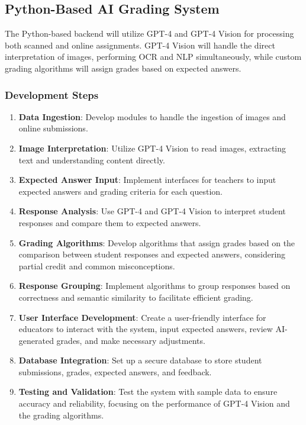 \documentclass[ms,twoside,print]{nuthesis}
\begin{document}
\subsection{Python-Based AI Grading System}

The Python-based backend will utilize GPT-4 and GPT-4 Vision for processing both scanned and online assignments. GPT-4 Vision will handle the direct interpretation of images, performing OCR and NLP simultaneously, while custom grading algorithms will assign grades based on expected answers.

\subsubsection{Development Steps}

\begin{enumerate}
    \item \textbf{Data Ingestion}: Develop modules to handle the ingestion of images and online submissions.
    \item \textbf{Image Interpretation}: Utilize GPT-4 Vision to read images, extracting text and understanding content directly.
    \item \textbf{Expected Answer Input}: Implement interfaces for teachers to input expected answers and grading criteria for each question.
    \item \textbf{Response Analysis}: Use GPT-4 and GPT-4 Vision to interpret student responses and compare them to expected answers.
    \item \textbf{Grading Algorithms}: Develop algorithms that assign grades based on the comparison between student responses and expected answers, considering partial credit and common misconceptions.
    \item \textbf{Response Grouping}: Implement algorithms to group responses based on correctness and semantic similarity to facilitate efficient grading.
    \item \textbf{User Interface Development}: Create a user-friendly interface for educators to interact with the system, input expected answers, review AI-generated grades, and make necessary adjustments.
    \item \textbf{Database Integration}: Set up a secure database to store student submissions, grades, expected answers, and feedback.
    \item \textbf{Testing and Validation}: Test the system with sample data to ensure accuracy and reliability, focusing on the performance of GPT-4 Vision and the grading algorithms.
\end{enumerate}
\end{document}
